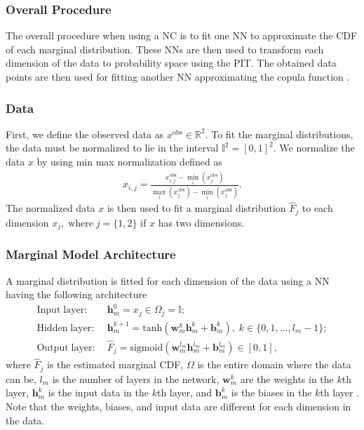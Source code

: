 \subsubsection{Overall Procedure}
The overall procedure when using a \gls{NC} is to fit one \gls{NN} to approximate the \gls{CDF} of each marginal distribution. These \gls{NN}s are then used to transform each dimension of the data to probability space using the \gls{PIT}. The obtained data points are then used for fitting another \gls{NN} approximating the copula function . 

\subsubsection{Data}
First, we define the observed data as $x^{\mathrm{obs}}\in \mathbb{R}^2 $. To fit the marginal distributions, the data must be normalized to lie in the interval $\mathbb{I}^2 = [0,1]^2$. We normalize the data $x$ by using min max normalization defined as
\begin{align*}
    x_{i,j} = \frac{x_{i,j}^{\mathrm{obs}} - \min_i(x_{j}^{\mathrm{obs}})}{  \max_i(x_{j}^{\mathrm{obs}})- \min_i(x_{j}^{\mathrm{obs}})}.
\end{align*}
The normalized data $x$ is then used to fit a marginal distribution $\hat{F}_j$ to each dimension $x_j, \; \mathrm{where} \; j=\{1,2\}$ if $x$ has two dimensions. 


\subsubsection{Marginal Model Architecture}
A marginal distribution is fitted for each dimension of the data using a \gls{NN} having the following architecture 
\begin{align*}
    \mathrm{Input\;layer:} \; & \mathbf{h}_m^0 = x_j \in \Omega_j = \mathbb{I}; \\
    \mathrm{Hidden\;layer:} \; & \mathbf{h}_m^{k+1} = \mathrm{tanh}(\mathbf{w}_m^{k} \mathbf{h}_m^{k} + \mathbf{b}_m^{k}), \; k \in \{0,1, \dots, l_m -1 \};\\
    \mathrm{Output\;layer:} \; & \hat{F}_j = \mathrm{sigmoid}(\mathbf{w}_m^{l_m} \mathbf{h}_m^{l_m} + \mathbf{b}_m^{l_m}) \in \left[0,1 \right],
\end{align*}
where $\hat{F}_j$ is the estimated marginal \gls{CDF}, $\Omega$ is the entire domain where the data can be, $l_m$ is the number of layers in the network, $\mathbf{w}_m^{k}$ are the weights in the $k$th layer,  $\mathbf{h}_m^{k}$ is the input data in the $k$th layer, and $\mathbf{b}_m^{k}$ is the biases in the $k$th layer . Note that the weights, biases, and input data are different for each dimension in the data. 

